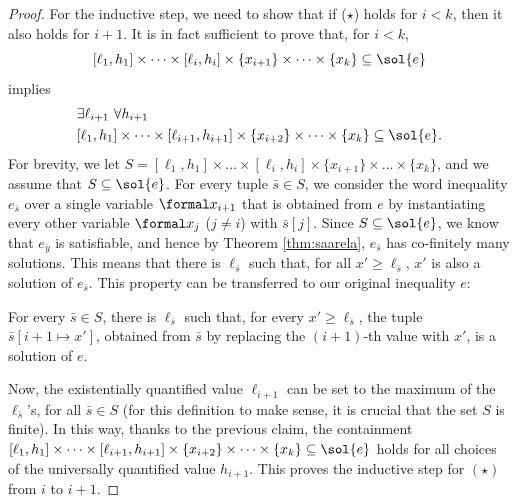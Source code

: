 \documentclass{article}
\begin{document}
\begin{proof}
For the inductive step, we need to show that 
if ($\star$) holds for $i<k$, then it also holds for $i+1$.
It is in fact sufficient to prove that, for $i<k$,
\[
  [\ell_1,h_1]\times\cdots\times[\ell_i,h_i]\times
  \{x_{i+1}\}\times\dots\times\{x_k\} 
  \subseteq \sol{e}
\]
implies
\begin{align*}
  & \exists \ell_{i+1} ~ \forall h_{i+1} \\
  & [\ell_1,h_1]\times\cdots\times[\ell_{i+1},h_{i+1}]\times
    \{x_{i+2}\}\times\dots\times\{x_k\} 
    \subseteq \sol{e}.
\end{align*}
For brevity, we let 
$S = [\ell_1,h_1]\times\dots\times[\ell_i,h_i]\times    
     \{x_{i+1}\}\times\dots\times\{x_k\}$,
and we assume that $S\subseteq \sol{e}$.
For every tuple $\bar s\in S$, we consider the word inequality 
$e_{\bar s}$ over a single
variable $\formal x_{i+1}$ that is obtained from $e$ by instantiating every other variable
$\formal x_j$ ($j\neq i$) with $\bar s[j]$.
Since $S\subseteq\sol{e}$, we know that $e_{\bar y}$ is satisfiable, and hence
by Theorem \ref{thm:saarela}, $e_{\bar s}$ has co-finitely many solutions.
This means that there is $\ell_{\bar s}$ such that, for all $x'\ge \ell_{\bar s}$, 
$x'$ is also a solution of $e_{\bar s}$.
This property can be transferred to our original inequality $e$:

\begin{claim*}\label{claim:saarela3}
For every $\bar s\in S$, there is $\ell_{\bar s}$ such that,
for every $x'\ge \ell_{\bar s}$, the tuple $\bar s[i+1 \mapsto x']$, 
obtained from $\bar s$ by replacing the $(i+1)$-th value with $x'$,
is a solution of $e$.
\end{claim*}

Now, 
the existentially quantified value $\ell_{i+1}$ 
can be set to
the maximum of the $\ell_{\bar s}$'s, for all $\bar s\in S$
(for this definition to make sense, it is crucial that the set $S$ is finite).
In this way, thanks to the previous claim, the containment 
$[\ell_1,h_1]\times\cdots\times[\ell_{i+1},h_{i+1}]\times\{x_{i+2}\}\times\dots\times\{x_k\} \subseteq \sol{e}$
holds for all choices of the universally quantified value $h_{i+1}$.
This proves the inductive step for $(\star)$ from $i$ to $i+1$.
\end{proof}
\end{document}
